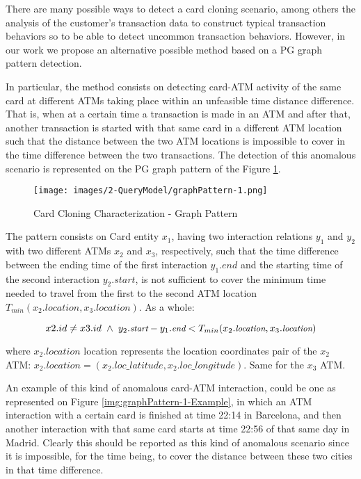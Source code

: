 There are many possible ways to detect a card cloning scenario, among others the analysis of the customer's transaction data to construct typical transaction behaviors so to be able to detect uncommon transaction behaviors. However, in our work we propose an alternative possible method based on a PG graph pattern detection.

In particular, the method consists on detecting card-ATM activity of the same card at different ATMs taking place within an unfeasible time distance difference. That is, when at a certain time a transaction is made in an ATM and after that, another transaction is started with that same card in a different ATM location such that the distance between the two ATM locations is impossible to cover in the time difference between the two transactions. The detection of this anomalous scenario is represented on the PG graph pattern of the Figure \ref{img:graphPattern-1}. 

\begin{figure}[H]
  \centering
  \texttt{[image: images/2-QueryModel/graphPattern-1.png]}
  \caption{Card Cloning Characterization - Graph Pattern}
  \label{img:graphPattern-1}
\end{figure}

The pattern consists on Card entity $x_1$, having two interaction relations $y_1$ and $y_2$ with two different ATMs $x_2$ and $x_3$, respectively, such that the time difference between the ending time of the first interaction $y_1.\textit{end}$ and the starting time of the second interaction $y_2.\textit{start}$, is not sufficient to cover the minimum time needed to travel from the first to the second ATM location $T_{min}(x_2.\textit{location}, x_3.\textit{location})$. As a whole:

$$
\small
x2.id \ne x3.id \ \land \ y_2.\textit{start} - y_1.\textit{end} < T_{min}(x_2.\textit{location}, x_3.\textit{location})
$$

where $x_2.\textit{location}$ location represents the location coordinates pair of the $x_2$ ATM: $x_2.location = (x_2.loc\_latitude, x_2.loc\_longitude)$. Same for the $x_3$ ATM.


An example of this kind of anomalous card-ATM interaction, could be one as represented on Figure \ref{img:graphPattern-1-Example}, in which an ATM interaction with a certain card is finished at time 22:14 in Barcelona, and then another interaction with that same card starts at time 22:56 of that same day in Madrid. Clearly this should be reported as this kind of anomalous scenario since it is impossible, for the time being, to cover the distance between these two cities in that time difference.


